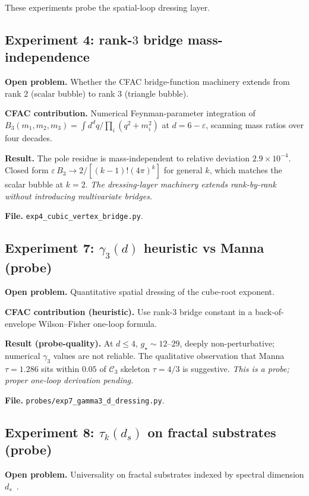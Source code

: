 \documentclass[11pt,a4paper]{article}
\theoremstyle{plain}
\newcommand{\Ck}{\mathcal{C}}
\begin{document}
These experiments probe the spatial-loop dressing layer.

\subsection*{Experiment 4: rank-$3$ bridge mass-independence}

\textbf{Open problem.}  Whether the CFAC bridge-function machinery
extends from rank $2$ (scalar bubble) to rank $3$ (triangle bubble).

\textbf{CFAC contribution.}  Numerical Feynman-parameter integration of
$B_{3}(m_{1},m_{2},m_{3}) = \int d^{d}q / \prod_{i}(q^{2}+m_{i}^{2})$ at
$d = 6 - \varepsilon$, scanning mass ratios over four decades.

\textbf{Result.}  The pole residue is mass-independent to relative
deviation $2.9\times 10^{-4}$.  Closed form $\varepsilon\,B_{3} \to
2/[(k-1)!(4\pi)^{k}]$ for general $k$, which matches the scalar bubble
at $k=2$.  \emph{The dressing-layer machinery extends rank-by-rank
without introducing multivariate bridges.}

\textbf{File.}  \texttt{exp4\_cubic\_vertex\_bridge.py}.

\subsection*{Experiment 7: $\gamma_{3}(d)$ heuristic vs Manna (probe)}

\textbf{Open problem.}  Quantitative spatial dressing of the cube-root
exponent.

\textbf{CFAC contribution (heuristic).}  Use rank-$3$ bridge constant in a
back-of-envelope Wilson--Fisher one-loop formula.

\textbf{Result (probe-quality).}  At $d \leq 4$, $g_{\star}\sim 12$--$29$,
deeply non-perturbative; numerical $\gamma_{3}$ values are not reliable.
The qualitative observation that Manna $\tau=1.286$ sits within $0.05$
of $\Ck_{3}$ skeleton $\tau=4/3$ is suggestive.  \emph{This is a probe;
proper one-loop derivation pending.}

\textbf{File.}  \texttt{probes/exp7\_gamma3\_d\_dressing.py}.

\subsection*{Experiment 8: $\tau_{k}(d_{s})$ on fractal substrates (probe)}

\textbf{Open problem.}  Universality on fractal substrates indexed by
spectral dimension $d_{s}$~\citep{BurioniCassi2005,HavlinBenAvraham2002}.
\end{document}

